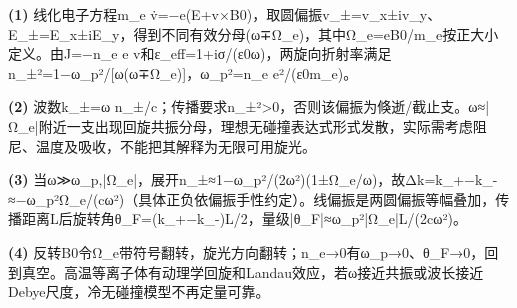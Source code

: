 \par\noindent\textbf{(1)} 线化电子方程m\_e v̇=−e(E+v×B0)，取圆偏振v\_±=v\_x±iv\_y、E\_±=E\_x±iE\_y，得到不同有效分母(ω∓Ω\_e)，其中Ω\_e=eB0/m\_e按正大小定义。由J=−n\_e e v和ε\_eff=1+iσ/(ε0ω)，两旋向折射率满足n\_±²=1−ω\_p²/[ω(ω∓Ω\_e)]，ω\_p²=n\_e e²/(ε0m\_e)。
\par\noindent\textbf{(2)} 波数k\_±=ω n\_±/c；传播要求n\_±²>0，否则该偏振为倏逝/截止支。ω≈|Ω\_e|附近一支出现回旋共振分母，理想无碰撞表达式形式发散，实际需考虑阻尼、温度及吸收，不能把其解释为无限可用旋光。
\par\noindent\textbf{(3)} 当ω≫ω\_p,|Ω\_e|，展开n\_±≈1−ω\_p²/(2ω²)(1±Ω\_e/ω)，故Δk=k\_+−k\_-≈−ω\_p²Ω\_e/(cω²)（具体正负依偏振手性约定）。线偏振是两圆偏振等幅叠加，传播距离L后旋转角θ\_F=(k\_+−k\_-)L/2，量级|θ\_F|≈ω\_p²|Ω\_e|L/(2cω²)。
\par\noindent\textbf{(4)} 反转B0令Ω\_e带符号翻转，旋光方向翻转；n\_e→0有ω\_p→0、θ\_F→0，回到真空。高温等离子体有动理学回旋和Landau效应，若ω接近共振或波长接近Debye尺度，冷无碰撞模型不再定量可靠。
